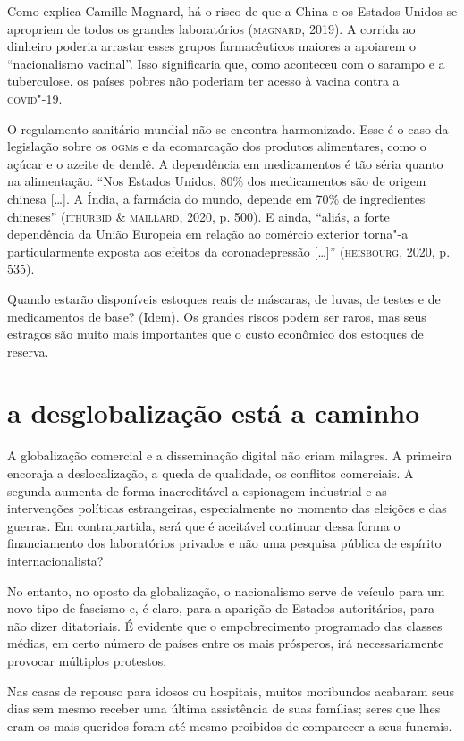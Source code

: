 Como explica Camille Magnard, há o risco de que a China e os Estados
Unidos se apropriem de todos os grandes laboratórios (\textsc{magnard}, 2019). A
corrida ao dinheiro poderia arrastar esses grupos farmacêuticos maiores
a apoiarem o ``nacionalismo vacinal''. Isso significaria que, como
aconteceu com o sarampo e a tuberculose, os países pobres não poderiam
ter acesso à vacina contra a \textsc{covid}"-19.

O regulamento sanitário mundial não se encontra harmonizado. Esse é o
caso da legislação sobre os \textsc{ogm}s e da ecomarcação dos produtos
alimentares, como o açúcar e o azeite de dendê. A dependência em
medicamentos é tão séria quanto na alimentação. ``Nos Estados Unidos,
80\% dos medicamentos são de origem chinesa {[}\ldots{}{]}. A Índia, a
farmácia do mundo, depende em 70\% de ingredientes chineses'' (\textsc{ithurbid}
\& \textsc{maillard}, 2020, p. 500). E ainda, ``aliás, a forte dependência da
União Europeia em relação ao comércio exterior torna"-a particularmente
exposta aos efeitos da coronadepressão {[}\ldots{}{]}'' (\textsc{heisbourg}, 2020, p.
535).

Quando estarão disponíveis estoques reais de máscaras, de luvas, de
testes e de medicamentos de base? (Idem). Os grandes riscos podem ser
raros, mas seus estragos são muito mais importantes que o custo
econômico dos estoques de reserva.

\section{a desglobalização está a caminho}

A globalização comercial e a disseminação digital não criam milagres. A
primeira encoraja a deslocalização, a queda de qualidade, os conflitos
comerciais. A segunda aumenta de forma inacreditável a espionagem
industrial e as intervenções políticas estrangeiras, especialmente no
momento das eleições e das guerras. Em contrapartida, será que é
aceitável continuar dessa forma o financiamento dos laboratórios
privados e não uma pesquisa pública de espírito internacionalista?

No entanto, no oposto da globalização, o nacionalismo serve de veículo
para um novo tipo de fascismo e, é claro, para a aparição de Estados
autoritários, para não dizer ditatoriais. É evidente que o
empobrecimento programado das classes médias, em certo número de países
entre os mais prósperos, irá necessariamente provocar múltiplos
protestos.

Nas casas de repouso para idosos ou hospitais, muitos moribundos
acabaram seus dias sem mesmo receber uma última assistência de suas
famílias; seres que lhes eram os mais queridos foram até mesmo proibidos
de comparecer a seus funerais.


